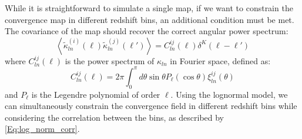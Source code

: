 \documentclass{aa}
\begin{document}
While it is straightforward to simulate a single map, if we want to constrain the convergence map in different redshift bins, an additional condition must be met. The covariance of the map should recover the correct angular power spectrum:
\begin{equation}\label{power_spectrum_definition}
    \left \langle \tilde{\kappa}^{(i)}_{ln} (\ell)\tilde{\kappa}^{(j)}_{ln}(\ell')\right \rangle =C^{ij}_{ln}(\ell)\delta^{K}(\ell-\ell')
\end{equation}
where $ C^{ij}_{ln}(\ell)$ is the power spectrum of $\kappa_{ln}$ in Fourier space, defined as:
\begin{equation}\label{Eq:log_norm_cls}
    C^{ij}_{ln}(\ell)=2\pi \int_0^{\pi} d\theta \sin{\theta}P_{\ell}(\cos{\theta})\xi^{ij}_{ln}(\theta)
\end{equation}
and $P_{\ell}$ is the Legendre polynomial of order $\ell$. 
Using the lognormal model, we can simultaneously constrain the convergence field in different redshift bins while considering the correlation between the bins, as described by \autoref{Eq:log_norm_corr}.
\end{document}
